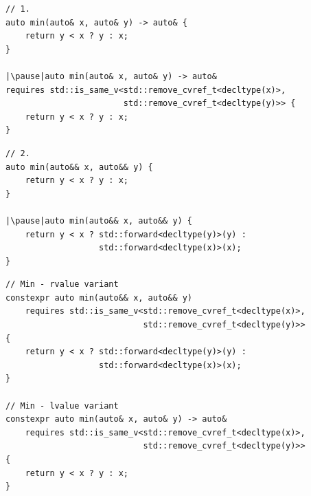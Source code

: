 \documentclass[aspectratio=169]{beamer}
\begin{document}
\begin{frame}[fragile]{}
\begin{small}
\begin{verbatim}
// 1.
auto min(auto& x, auto& y) -> auto& {
    return y < x ? y : x;
}

|\pause|auto min(auto& x, auto& y) -> auto&
requires std::is_same_v<std::remove_cvref_t<decltype(x)>, 
                        std::remove_cvref_t<decltype(y)>> {
    return y < x ? y : x;
}
\end{verbatim}
\end{small}
\end{frame}

\begin{frame}[fragile]{}
\begin{small}
\begin{verbatim}
// 2.
auto min(auto&& x, auto&& y) {
    return y < x ? y : x;
}

|\pause|auto min(auto&& x, auto&& y) {
    return y < x ? std::forward<decltype(y)>(y) : 
                   std::forward<decltype(x)>(x);
}
\end{verbatim}
\end{small}
\end{frame}

\begin{frame}[fragile]{}
\begin{small}
\begin{verbatim}
// Min - rvalue variant
constexpr auto min(auto&& x, auto&& y)
    requires std::is_same_v<std::remove_cvref_t<decltype(x)>, 
                            std::remove_cvref_t<decltype(y)>>
{
    return y < x ? std::forward<decltype(y)>(y) : 
                   std::forward<decltype(x)>(x);
}

// Min - lvalue variant
constexpr auto min(auto& x, auto& y) -> auto&
    requires std::is_same_v<std::remove_cvref_t<decltype(x)>, 
                            std::remove_cvref_t<decltype(y)>>
{
    return y < x ? y : x;
}
\end{verbatim}
\end{small}
\end{frame}

\end{document}
